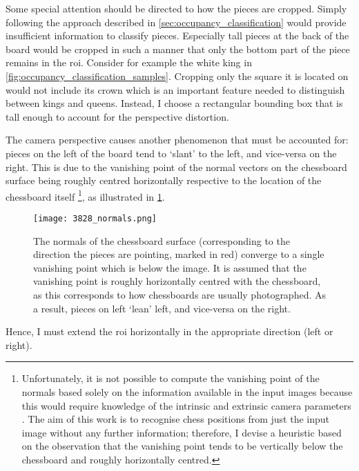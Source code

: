 \documentclass[../report.tex]{subfiles}
\begin{document}
Some special attention should be directed to how the pieces are cropped. 
Simply following the approach described in \cref{sec:occupancy_classification} would provide insufficient information to classify pieces.
Especially tall pieces at the back of the board would be cropped in such a manner that only the bottom part of the piece remains in the \gls{roi}. 
Consider for example the white king in \cref{fig:occupancy_classification_samples}.
Cropping only the square it is located on would not include its crown which is an important feature needed to distinguish between kings and queens.
Instead, I choose a rectangular bounding box that is tall enough to account for the perspective distortion.

The camera perspective causes another phenomenon that must be accounted for: pieces on the left of the board tend to `slant' to the left, and vice-versa on the right.
This is due to the vanishing point of the normal vectors on the chessboard surface being roughly centred horizontally respective to the location of the chessboard itself%
\footnote{%
    Unfortunately, it is not possible to compute the vanishing point of the normals based solely on the information available in the input images because this would require knowledge of the intrinsic and extrinsic camera parameters \cite{hartley2004}.
    The aim of this work is to recognise chess positions from just the input image without any further information; therefore, I devise a heuristic based on the observation that the vanishing point tends to be vertically below the chessboard and roughly horizontally centred.
}, as illustrated in \cref{fig:occupancy_classification_normals}.
\begin{figure}
    \centering
    \texttt{[image: 3828\_normals.png]}
    \caption[The normals of the chessboard surface converge to a single vanishing point which is below the image.]{The normals of the chessboard surface (corresponding to the direction the pieces are pointing, marked in red) converge to a single vanishing point which is below the image. It is assumed that the vanishing point is roughly horizontally centred with the chessboard, as this corresponds to how chessboards are usually photographed. As a result, pieces on left `lean' left, and vice-versa on the right.}
    \label{fig:occupancy_classification_normals}
\end{figure}
Hence, I must extend the \gls{roi} horizontally in the appropriate direction (left or right).
\end{document}
